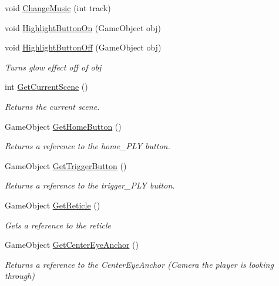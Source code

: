 \begin{DoxyCompactItemize}
\begin{DoxyCompactList}
{\ttfamily {\ttfamily  }}\end{DoxyCompactList}\item 
void \mbox{\hyperlink{class_intro_session_manager_af70a43fd234d1f362d0b9d75a613e9db}{Change\+Music}} (int track)
\item 
void \mbox{\hyperlink{class_intro_session_manager_a5f7f82cd17d0cfd8c54abd6dffcde081}{Highlight\+Button\+On}} (Game\+Object obj)
\item 
void \mbox{\hyperlink{class_intro_session_manager_afa85136787b9c937f76f92c22314341d}{Highlight\+Button\+Off}} (Game\+Object obj)
\begin{DoxyCompactList}\small\item\em Turns glow effect off of obj \end{DoxyCompactList}\item 
int \mbox{\hyperlink{class_intro_session_manager_a16f670a63e6d68ef3ae65573b3a7b01f}{Get\+Current\+Scene}} ()
\begin{DoxyCompactList}\small\item\em Returns the current scene. \end{DoxyCompactList}\item 
Game\+Object \mbox{\hyperlink{class_intro_session_manager_a7ce12de7f1dfcec0ad8b57f7e867a30d}{Get\+Home\+Button}} ()
\begin{DoxyCompactList}\small\item\em Returns a reference to the {\ttfamily home\+\_\+\+P\+LY} button. \end{DoxyCompactList}\item 
Game\+Object \mbox{\hyperlink{class_intro_session_manager_a78cade3f987f624f20d216b53a1c8f90}{Get\+Trigger\+Button}} ()
\begin{DoxyCompactList}\small\item\em Returns a reference to the {\ttfamily trigger\+\_\+\+P\+LY} button. \end{DoxyCompactList}\item 
Game\+Object \mbox{\hyperlink{class_intro_session_manager_a8932e2f5e73d5f9915a703f87e5c9f49}{Get\+Reticle}} ()
\begin{DoxyCompactList}\small\item\em Gets a reference to the reticle \end{DoxyCompactList}\item 
Game\+Object \mbox{\hyperlink{class_intro_session_manager_afbbc0627840abc6a3666eba25a7efd76}{Get\+Center\+Eye\+Anchor}} ()
\begin{DoxyCompactList}\small\item\em Returns a reference to the Center\+Eye\+Anchor (Camera the player is looking through) \end{DoxyCompactList}\item 

\end{DoxyCompactItemize}
